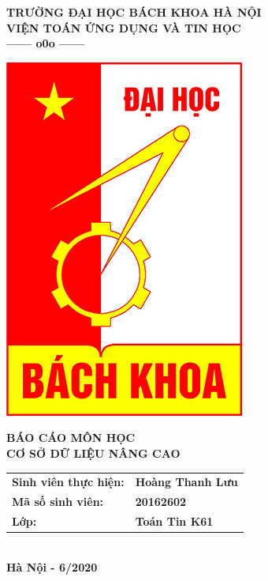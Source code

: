 \documentclass[12pt,a4paper]{report}
\begin{document}
	\thisfancypage{%
		\setlength{\fboxsep}{0pt}%
		\fbox}{} %
	\thispagestyle{empty}
	\begin{center}
		\vspace*{0.2cm}
		\fontsize{14}{12}
		\textbf{TRƯỜNG ĐẠI HỌC BÁCH KHOA HÀ NỘI}\\
		\textbf{VIỆN TOÁN ỨNG DỤNG VÀ TIN HỌC}\\
		\textbf{------ o0o ------}
	\end{center}
	\vspace*{0.8cm}
	\begin{center}
		\includegraphics[scale=.5]{bk.png}
	\end{center}
	\vspace*{0.8cm}
	\begin{center}
		\fontsize{20}{18}
		\textbf{BÁO CÁO MÔN HỌC\\ CƠ SỞ DỮ LIỆU NÂNG CAO}\\
		\vspace*{0.8cm}
		\fontsize{18}{16}
	\end{center}
	\vspace*{0.7cm}
	\begin{center}
		\fontsize{14}{16}
		\begin{tabular}{ll}
			 
			\textbf{Sinh viên thực hiện:} & \textbf{Hoàng Thanh Lưu} \\ 
			\textbf{Mã số sinh viên:} & \textbf{20162602}\\
			\textbf{Lớp:}  & \textbf{Toán Tin K61} \\ 
		\end{tabular} \\
		\vspace*{2.5cm}
		\fontsize{14}{16}
		\textbf{Hà Nội - 6/2020}
	\end{center}
\end{document}
